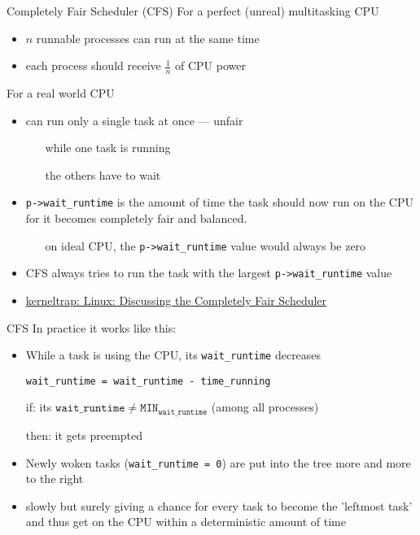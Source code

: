 \begin{frame}{Completely Fair Scheduler (CFS)}
  For a perfect (unreal) multitasking CPU
  \begin{itemize}
  \item $n$ runnable processes can run at the same time
  \item each process should receive $\frac{1}{n}$ of CPU power
  \end{itemize}
  
  For a real world CPU
  \begin{itemize}
  \item can run only a single task at once --- unfair
    \begin{itemize}
    \item[\Smiley] while one task is running
    \item[\Frowny\Frowny] the others have to wait
    \end{itemize}
  \item \texttt{p->wait\_runtime} is the amount of time the task should now run on the CPU
    for it becomes completely fair and balanced.
    \begin{itemize}
    \item[\Smiley] on ideal CPU, the \texttt{p->wait\_runtime} value would always be zero
    \end{itemize}
  \item CFS always tries to run the task with the largest \texttt{p->wait\_runtime} value
  \end{itemize}
\end{frame}

\begin{itemize}
\item \href{http://kerneltrap.org/node/8208}{kerneltrap: Linux: Discussing the Completely
    Fair Scheduler}
\end{itemize}

\begin{frame}{CFS}
  In practice it works like this:
  \begin{itemize}
  \item While a task is using the CPU, its \texttt{wait\_runtime} decreases
    \begin{center}
      \texttt{wait\_runtime = wait\_runtime - time\_running}
    \end{center}
  \item[if:] its $\mathtt{wait\_runtime \ne \mathtt{MIN}_{wait\_runtime}}$
    (among all processes)
  \item[then:] it gets preempted
  \item Newly woken tasks (\texttt{wait\_runtime = 0}) are put into the tree more and more
    to the right
  \item slowly but surely giving a chance for every task to become the 'leftmost task' and
    thus get on the CPU within a deterministic amount of time
  \end{itemize}
\end{frame}

